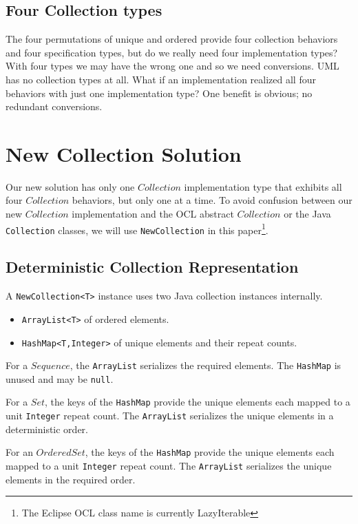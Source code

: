 \documentclass{llncs}
\begin{document}
\subsection{Four Collection types}

The four permutations of unique and ordered provide four collection behaviors and four specification types, but do we really need four implementation types? With four types we may have the wrong one and so we need conversions. UML~\cite{UML-2.5} has no collection types at all. What if an implementation realized all four behaviors with just one implementation type? One benefit is obvious; no redundant conversions.

\section{New Collection Solution}\label{Solutions}

Our new solution has only one $Collection$ implementation type that exhibits all four $Collection$ behaviors, but only one at a time. To avoid confusion between our new $Collection$ implementation and the OCL abstract $Collection$ or the Java \verb$Collection$ classes, we will use \verb$NewCollection$ in this paper\footnote{The Eclipse OCL class name is currently LazyIterable}.

\subsection{Deterministic Collection Representation}

A \verb$NewCollection<T>$ instance uses two Java collection instances internally.

\begin{itemize}
	\item \verb$ArrayList<T>$ of ordered elements.
	\item \verb$HashMap<T,Integer>$ of unique elements and their repeat counts.
\end{itemize}

For a $Sequence$, the \verb$ArrayList$ serializes the required elements. The \verb$HashMap$ is unused and may be \verb$null$.

For a $Set$, the keys of the \verb$HashMap$ provide the unique elements each mapped to a unit \verb$Integer$ repeat count. The \verb$ArrayList$ serializes the unique elements in a deterministic order.

For an $OrderedSet$, the keys of the \verb$HashMap$ provide the unique elements each mapped to a unit \verb$Integer$ repeat count. The \verb$ArrayList$ serializes the unique elements in the required order.
\end{document}
